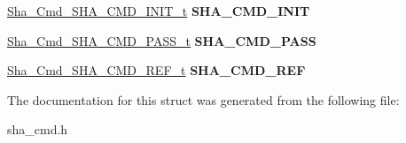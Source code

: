\begin{DoxyCompactItemize}
\item 
\hypertarget{struct__Sha__Cmd__Sha__Cmd__t_a9f3c57416c51e877bc6f937d580f89bd}{\hyperlink{union__Sha__Cmd__SHA__CMD__INIT__t}{Sha\-\_\-\-Cmd\-\_\-\-S\-H\-A\-\_\-\-C\-M\-D\-\_\-\-I\-N\-I\-T\-\_\-t} {\bfseries S\-H\-A\-\_\-\-C\-M\-D\-\_\-\-I\-N\-I\-T}}\label{struct__Sha__Cmd__Sha__Cmd__t_a9f3c57416c51e877bc6f937d580f89bd}

\item 
\hypertarget{struct__Sha__Cmd__Sha__Cmd__t_aec6af414c3b02fd91bbfd7e9f9b5c23e}{\hyperlink{union__Sha__Cmd__SHA__CMD__PASS__t}{Sha\-\_\-\-Cmd\-\_\-\-S\-H\-A\-\_\-\-C\-M\-D\-\_\-\-P\-A\-S\-S\-\_\-t} {\bfseries S\-H\-A\-\_\-\-C\-M\-D\-\_\-\-P\-A\-S\-S}}\label{struct__Sha__Cmd__Sha__Cmd__t_aec6af414c3b02fd91bbfd7e9f9b5c23e}

\item 
\hypertarget{struct__Sha__Cmd__Sha__Cmd__t_a989677201ab52481956dab8a4ed43114}{\hyperlink{union__Sha__Cmd__SHA__CMD__REF__t}{Sha\-\_\-\-Cmd\-\_\-\-S\-H\-A\-\_\-\-C\-M\-D\-\_\-\-R\-E\-F\-\_\-t} {\bfseries S\-H\-A\-\_\-\-C\-M\-D\-\_\-\-R\-E\-F}}\label{struct__Sha__Cmd__Sha__Cmd__t_a989677201ab52481956dab8a4ed43114}

\end{DoxyCompactItemize}


The documentation for this struct was generated from the following file\-:\begin{DoxyCompactItemize}
\item 
sha\-\_\-cmd.\-h\end{DoxyCompactItemize}
